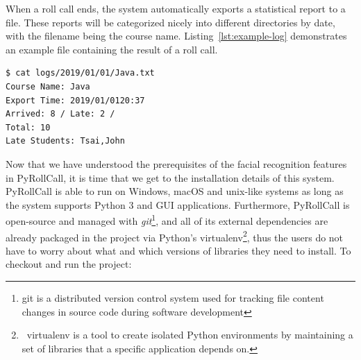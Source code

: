 



When a roll call ends, the system automatically exports a statistical report to a file.
These reports will be categorized nicely into different directories by date,
with the filename being the course name. Listing~\ref{lst:example-log} demonstrates
an example file containing the result of a roll call.
\clearpage

\begin{lstlisting}[numbers=none,xleftmargin=0em,caption={Layout of PyRollCall's root directory.},label={lst:example-log}]
$ cat logs/2019/01/01/Java.txt
Course Name: Java
Export Time: 2019/01/0120:37
Arrived: 8 / Late: 2 / 
Total: 10
Late Students: Tsai,John
\end{lstlisting}

Now that we have understood the prerequisites of the facial recognition features in PyRollCall,
it is time that we get to the installation details of this system. PyRollCall is able to run on Windows,
macOS and unix-like systems as long as the system supports Python 3 and GUI applications.
Furthermore, PyRollCall is open-source and managed with \emph{git}\footnote{git is a distributed
  version control system used for tracking file content changes in source code during software development},
and all of its external dependencies are already packaged in the project via Python's {virtualenv}\footnote{\
  virtualenv is a tool to create isolated Python environments by maintaining a set of libraries that a specific application depends on.},
thus the users do not have to worry about what and which versions of libraries they need to install. To checkout and run the project:

